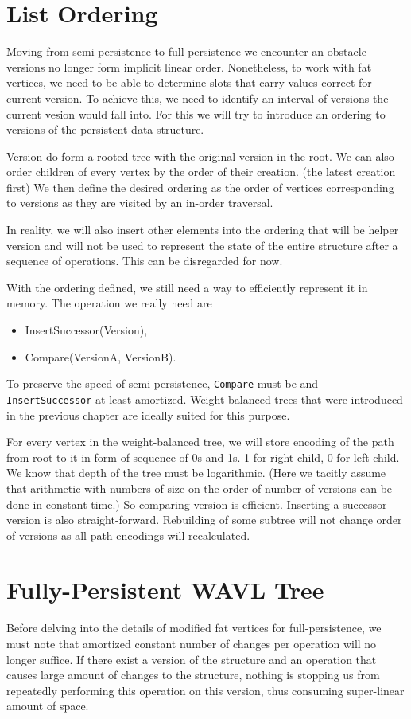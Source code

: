 \section{List Ordering}

Moving from semi-persistence to full-persistence we encounter an obstacle -- versions no longer form implicit linear order. Nonetheless, to work with fat vertices, we need to be able to determine slots that carry values correct for current version. To achieve this, we need to identify an interval of versions the current vesion would fall into. For this we will try to introduce an ordering to versions of the persistent data structure.

Version do form a rooted tree with the original version in the root. We can also order children of every vertex by the order of their creation. (the latest creation first) We then define the desired ordering as the order of vertices corresponding to versions as they are visited by an in-order traversal.

In reality, we will also insert other elements into the ordering that will be helper version and will not be used to represent the state of the entire structure after a sequence of operations. This can be disregarded for now.

With the ordering defined, we still need a way to efficiently represent it in memory. The operation we really need are

\begin{itemize}
	\item InsertSuccessor(Version),
	\item Compare(VersionA, VersionB).
\end{itemize}

To preserve the speed of semi-persistence, \texttt{Compare} must be  and \texttt{InsertSuccessor}  at least amortized. Weight-balanced trees that were introduced in the previous chapter are ideally suited for this purpose.

For every vertex in the weight-balanced tree, we will store encoding of the path from root to it in form of sequence of 0s and 1s. 1 for right child, 0 for left child. We know that depth of the tree must be logarithmic. (Here we tacitly assume that arithmetic with numbers of size on the order of number of versions can be done in constant time.) So comparing version is efficient. Inserting a successor version is also straight-forward. Rebuilding of some subtree will not change order of versions as all path encodings will recalculated.

\section{Fully-Persistent WAVL Tree}

Before delving into the details of modified fat vertices for full-persistence, we must note that amortized constant number of changes per operation will no longer suffice. If there exist a version of the structure and an operation that causes large amount of changes to the structure, nothing is stopping us from repeatedly performing this operation on this version, thus consuming super-linear amount of space.